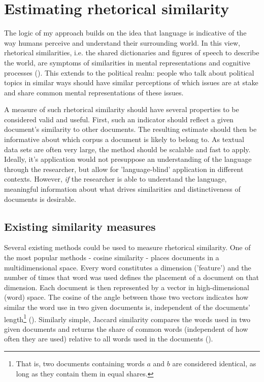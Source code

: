 \documentclass{article}
\begin{document}
\section{Estimating rhetorical similarity}


The logic of my approach builds on the idea that language is indicative of the way humans perceive and understand their surrounding world. In this view, rhetorical similarities, i.e. the shared dictionaries and figures of speech to describe the world, are symptoms of similarities in mental representations and cognitive processes (\cite{Pennebaker2003, Lakoff1980Metaphors}). This extends to the political realm: people who talk about political topics in similar ways should have similar perceptions of which issues are at stake and share common mental representations of these issues.\par

A measure of such rhetorical similarity should have several properties to be considered valid and useful. First, such an indicator should reflect a given document's similarity to other documents. The resulting estimate should then be informative about which corpus a document is likely to belong to. As textual data sets are often very large, the method should be scalable and fast to apply. Ideally, it's application would not presuppose an understanding of the language through the researcher, but allow for 'language-blind' application in different contexts. However, \textit{if} the researcher is able to understand the language, meaningful information about what drives similarities and distinctiveness of documents is desirable. \par


\subsection{Existing similarity measures}

Several existing methods could be used to measure rhetorical similarity. One of the most popular methods - cosine similarity - places documents in a multidimensional space. Every word constitutes a dimension ('feature') and the number of times that word was used defines the placement of a document on that dimension. Each document is then represented by a vector in high-dimensional (word) space. The cosine of the angle between those two vectors indicates how similar the word use in two given documents is, independent of the documents' length\footnote{That is, two documents containing words $a$ and $b$ are considered identical, as long as they contain them in equal shares.} (\cite{Similarity2007a}).  Similarly simple, Jaccard similarity compares the words used in two given documents and returns the share of common words (independent of how often they are used) relative to all words used in the documents (\cite{Jaccard1912}).\par
\end{document}
